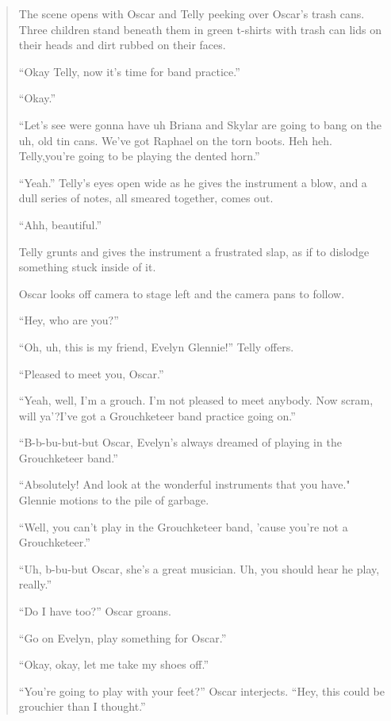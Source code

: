 \documentclass[12pt,letterpaper]{article}
\begin{document}
	\begin{quote}

	\ttfamily
	
	The scene opens with Oscar and Telly peeking over Oscar's trash cans. 
	Three children stand beneath them in green t-shirts with trash can lids
	on their heads and dirt rubbed on their faces.

	``Okay Telly, now it's time for band practice.''

	``Okay.''

	``Let's see were gonna have uh Briana and Skylar are going to bang on 
	the uh, old tin cans. We've got Raphael on the torn boots. Heh heh. 
	Telly,you're going to be playing the dented horn.''

	``Yeah.'' Telly's eyes open wide as he gives the instrument a blow, and 
	a dull series of notes, all smeared together, comes out. 

	``Ahh, beautiful.'' 

	Telly grunts and gives the instrument a frustrated slap, as if to 
	dislodge something stuck inside of it.

	Oscar looks off camera to stage left and the camera pans to follow. 

	``Hey, who are you?''

	``Oh, uh, this is my friend, Evelyn Glennie!'' Telly offers.

	``Pleased to meet you, Oscar.''  

	``Yeah, well, I'm a grouch. I'm not pleased to meet anybody. Now scram, 
	will ya'?I've got a Grouchketeer band practice going on.''

	``B-b-bu-but-but Oscar, Evelyn's always dreamed of playing in the 
	Grouchketeer band.''

	``Absolutely! And look at the wonderful instruments that you have." 
	Glennie motions to the pile of garbage.  

	``Well, you can't play in the Grouchketeer band, 'cause you're not a 
	Grouchketeer.''

	``Uh, b-bu-but Oscar, she's a great musician. Uh, you should hear he 
	play, really.''

	``Do I have too?'' Oscar groans.

	``Go on Evelyn, play something for Oscar.''

	``Okay, okay, let me take my shoes off.''

	``You're going to play with your feet?'' Oscar interjects. ``Hey, this 
	could be grouchier than I thought.''


\end{quote}
\end{document}
